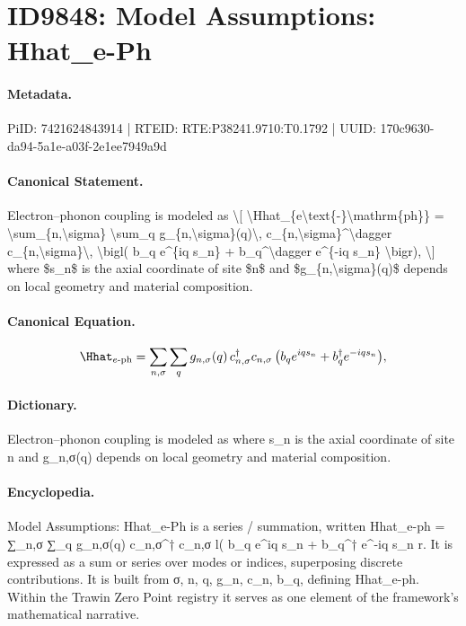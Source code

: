 \section*{ID9848: Model Assumptions: Hhat\_e-Ph}
\paragraph{Metadata.}
PiID: 7421624843914 | RTEID: RTE:P38241.9710:T0.1792 | UUID: 170c9630-da94-5a1e-a03f-2e1ee7949a9d

\paragraph{Canonical Statement.}
Electron--phonon coupling is modeled as \textbackslash{}[ \textbackslash{}Hhat\_\{e\textbackslash{}text\{-\}\textbackslash{}mathrm\{ph\}\} = \textbackslash{}sum\_\{n,\textbackslash{}sigma\} \textbackslash{}sum\_q g\_\{n,\textbackslash{}sigma\}(q)\textbackslash{}, c\_\{n,\textbackslash{}sigma\}\textasciicircum{}\textbackslash{}dagger c\_\{n,\textbackslash{}sigma\}\textbackslash{}, \textbackslash{}bigl( b\_q e\textasciicircum{}\{iq s\_n\} + b\_q\textasciicircum{}\textbackslash{}dagger e\textasciicircum{}\{-iq s\_n\} \textbackslash{}bigr), \textbackslash{}] where \$s\_n\$ is the axial coordinate of site \$n\$ and \$g\_\{n,\textbackslash{}sigma\}(q)\$ depends on local geometry and material composition.

\paragraph{Canonical Equation.}
\[
\Hhat_{e\text{-}\mathrm{ph}} = \sum_{n,\sigma} \sum_q g_{n,\sigma}(q)\, c_{n,\sigma}^\dagger c_{n,\sigma}\, \bigl( b_q e^{iq s_n} + b_q^\dagger e^{-iq s_n} \bigr),
\]

\paragraph{Dictionary.}
Electron--phonon coupling is modeled as where s\_n is the axial coordinate of site n and g\_n,σ(q) depends on local geometry and material composition.

\paragraph{Encyclopedia.}
Model Assumptions: Hhat\_e-Ph is a series / summation, written Hhat\_e-ph = ∑\_n,σ ∑\_q g\_n,σ(q) c\_n,σ\textasciicircum{}† c\_n,σ l( b\_q e\textasciicircum{}iq s\_n + b\_q\textasciicircum{}† e\textasciicircum{}-iq s\_n r. It is expressed as a sum or series over modes or indices, superposing discrete contributions. It is built from σ, n, q, g\_n, c\_n, b\_q, defining Hhat\_e-ph. Within the Trawin Zero Point registry it serves as one element of the framework's mathematical narrative.
